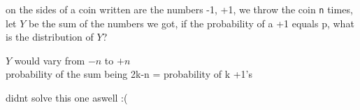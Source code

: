 \documentclass[a4paper,12pt]{article}
\begin{document}
\begin{question}
on the sides of a coin written are the numbers -1, +1, we throw the coin \texttt{n} times, let \(Y\) be the sum of the numbers we got, if the probability of a +1 equals p, what is the distribution of \(Y\)?\\
\begin{answer}
\(Y\) would vary from \(-n\) to \(+n\)\\
probability of the sum being 2k-n = probability of k +1's\\
\begin{note}
didnt solve this one aswell :(\\
\end{note}
\end{answer}
\end{question}
\end{document}
